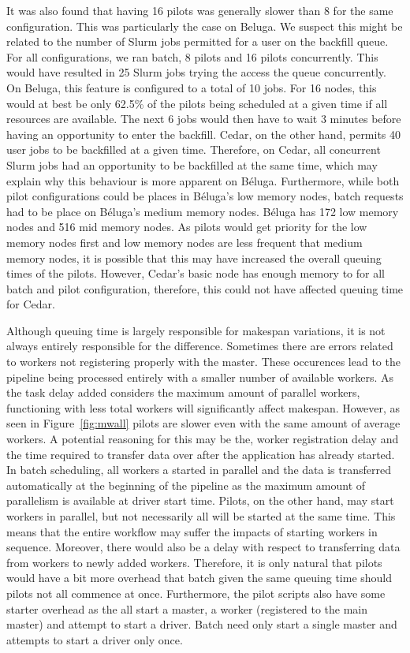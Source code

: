 \documentclass{IEEEtran}
\begin{document}
It was also found that having 16 pilots was generally slower than 8 for the same
configuration. This was particularly the case on Beluga. We suspect this might be
related to the number of Slurm jobs permitted for a user on the backfill queue. For
all configurations, we ran batch, 8 pilots and 16 pilots concurrently. This would have
resulted in 25 Slurm jobs trying the access the queue concurrently. On Beluga, this
feature is configured to a total of 10 jobs. For 16 nodes, this would at best be
only 62.5\% of the pilots being scheduled at a given time if all resources are available.
The next 6 jobs would then have to wait 3 minutes before having an opportunity to enter the
backfill. Cedar, on the other hand, permits 40 user jobs to be backfilled at a given time.
Therefore, on Cedar, all concurrent Slurm jobs had an opportunity to be backfilled at
the same time, which may explain why this behaviour is more apparent on B\'eluga. Furthermore,
while both pilot configurations could be places in B\'eluga's low memory nodes, batch requests
had to be place on B\'eluga's medium memory nodes. B\'eluga has 172 low memory nodes and
516 mid memory nodes. As pilots would get priority for the low memory nodes first and 
low memory nodes are less frequent that medium memory nodes, it is possible that this
may have increased the overall queuing times of the pilots. However, Cedar's basic
node has enough memory to for all batch and pilot configuration, therefore, this could not
have affected queuing time for Cedar.

Although queuing time is largely responsible for makespan variations, it is not
always entirely responsible for the difference. Sometimes there are errors related
to workers not registering properly with the master. These occurences lead to the 
pipeline being processed entirely with a smaller number of available workers. As the task
delay added considers the maximum amount of parallel workers, functioning with less total workers
will significantly affect makespan. However, as seen in Figure~\ref{fig:mwall}
pilots are slower even with the same amount of average workers. A potential reasoning for this
may be the, worker registration delay and the time required to transfer data
over after the application has already started. In batch scheduling, all workers a started in
parallel and the data is transferred automatically at the beginning of the pipeline as the maximum amount
of parallelism is available at driver start time. Pilots, on the other hand, may start workers in parallel,
but not necessarily all will be started at the same time. This means that the entire 
workflow may suffer the impacts of starting workers in sequence. Moreover, there would also
be a delay with respect to transferring data from workers to newly added workers. Therefore,
it is only natural that pilots would have a bit more overhead that batch given the same
queuing time should pilots not all commence at once. Furthermore, the pilot scripts also
have some starter overhead as the all start a master, a worker (registered to the main
master) and attempt to start a driver. Batch need only start a single master and attempts to start
a driver only once.
\end{document}
